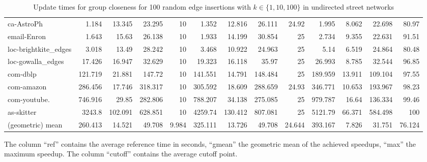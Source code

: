 \begin{landscape}
\begin{table}[h!]
\begin{tabular}{l|rrrr|rrrr|rrrr}
 ca-AstroPh           &    1.184 &  13.345 &  23.295 &   10     &    1.352 &  12.816 &  26.111 &   24.92  &    1.995 &   8.062 &  22.698 &   80.97  \\
 email-Enron          &    1.643 &  15.63  &  26.138 &   10     &    1.933 &  14.199 &  30.854 &   25     &    2.734 &   9.355 &  22.631 &   91.51  \\
 loc-brightkite\_edges &    3.018 &  13.49  &  28.242 &   10     &    3.468 &  10.922 &  24.963 &   25     &    5.14  &   6.519 &  24.864 &   80.48  \\
 loc-gowalla\_edges    &   17.426 &  16.947 &  32.629 &   10     &   19.323 &  16.118 &  35.97  &   25     &   26.993 &   8.785 &  32.544 &   96.85  \\
 com-dblp     &  121.719 &  21.881 & 147.72  &   10     &  141.551 &  14.791 & 148.484 &   25     &  189.959 &  13.911 & 109.104 &   97.55  \\
 com-amazon   &  286.456 &  17.746 & 318.317 &   10     &  305.592 &  18.609 & 288.659 &   24.93  &  346.771 &  10.653 & 193.967 &   98.23  \\
 com-youtube.  &  746.916 &  29.85  & 282.806 &   10     &  788.207 &  34.138 & 275.085 &   25     &  979.787 &  16.64  & 136.334 &   99.46  \\
 as-skitter           & 3243.8   & 102.091 & 628.851 &   10     & 4259.74  & 130.412 & 807.081 &   25     & 5121.79  &  66.371 & 584.498 &  100     \\ \midrule \midrule
 (geometric) mean     &  260.413 &  14.521 &  49.708 &    9.984 &  325.111 &  13.726 &  49.708 &   24.644 &  393.167 &   7.826 &  31.751 &   76.124 \\
\bottomrule
\end{tabular}
\caption{Update times for group closeness for 100 random edge insertions with  $k \in \{1, 10, 100\}$ in undirected street networks}{The column ``ref'' contains the average reference time in seconds, ``gmean'' the geometric mean of the achieved speedups, ``max'' the maximum speedup. The column ``cutoff'' contains the average cutoff point.}
\label{tbl:groupClosenessResults}
\end{table}	
\end{landscape}


